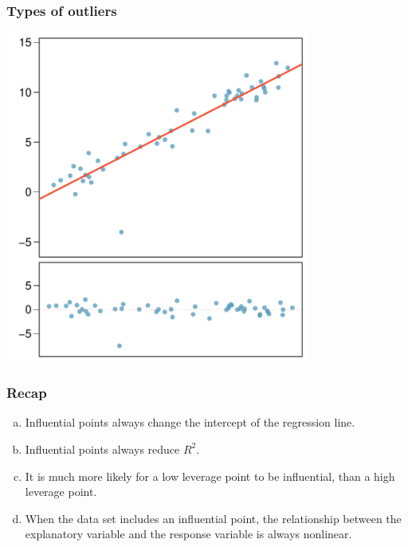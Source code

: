\documentclass[notes,11pt, aspectratio=169]{beamer}
\begin{document}
\begin{frame}
\frametitle{Types of outliers}

{

}
{
\begin{center}
\includegraphics[width=0.75\textwidth]{graphs/out1}
\end{center}
}

\end{frame}


\begin{frame}
\frametitle{Recap}


\begin{enumerate}[(a)]
\item Influential points always change the intercept of the regression line.
\item Influential points always reduce $R^2$.
\item It is much more likely for a low leverage point to be influential, than a high leverage point.
\item When the data set includes an influential point, the relationship between the explanatory variable and the response variable is always nonlinear.
\end{enumerate}

\end{frame}
\end{document}
